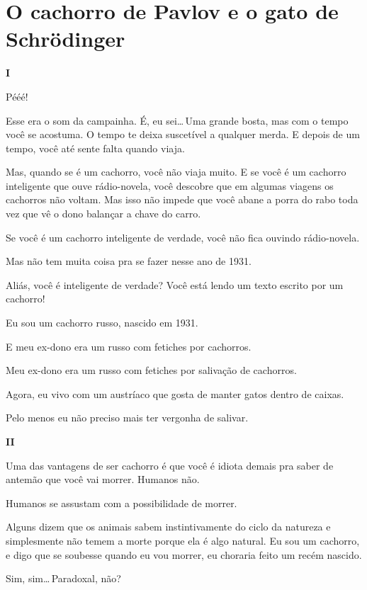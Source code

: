 \chapter{O cachorro de Pavlov e o gato de Schrödinger}

\begin{center}
{\Large \textbf{I}}
\end{center}

Pééé!

Esse era o som da campainha. É, eu sei\ldots\,Uma grande bosta, mas com o tempo você se acostuma. O tempo te deixa suscetível a qualquer merda. E depois de um tempo, você até sente falta quando viaja.

Mas, quando se é um cachorro, você não viaja muito. E se você é um cachorro inteligente que ouve rádio-novela, você descobre que em algumas viagens os cachorros não voltam. Mas isso não impede que você abane a porra do rabo toda vez que vê o dono balançar a chave do carro.

Se você é um cachorro inteligente de verdade, você não fica ouvindo rádio-novela.

Mas não tem muita coisa pra se fazer nesse ano de 1931.

Aliás, você é inteligente de verdade? Você está lendo um texto escrito por um cachorro!

Eu sou um cachorro russo, nascido em 1931.

E meu ex-dono era um russo com fetiches por cachorros.

Meu ex-dono era um russo com fetiches por salivação de cachorros.

Agora, eu vivo com um austríaco que gosta de manter gatos dentro de caixas.

Pelo menos eu não preciso mais ter vergonha de salivar.

\begin{center}
{\Large \textbf{II}}
\end{center}

Uma das vantagens de ser cachorro é que você é idiota demais pra saber de antemão que você vai morrer. Humanos não.

Humanos se assustam com a possibilidade de morrer.

Alguns dizem que os animais sabem instintivamente do ciclo da natureza e simplesmente não temem a morte porque ela é algo natural. Eu sou um cachorro, e digo que se soubesse quando eu vou morrer, eu choraria feito um recém nascido.

Sim, sim\ldots\,Paradoxal, não?

